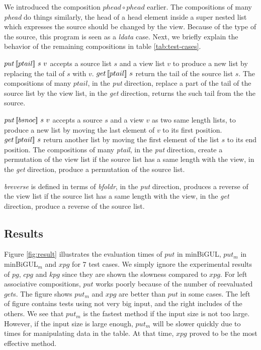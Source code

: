 We introduced the composition $phead \circ phead$ earlier. The compositions of many \textit{phead} do things similarly, the head of a head element inside a super nested list which expresses the source should be changed by the view. Because of the type of the source, this program is seen as a \textit{ldata} case. Next, we briefly explain the behavior of the remaining compositions in table \ref{tab:test-cases}.

$put \, [\![ptail]\!] \ s \ v$ accepts a source list $s$ and a view list $v$ to produce a new list by replacing the tail of $s$ with $v$. $get \, [\![ptail]\!] \ s$ return the tail of the source list $s$. The compositions of many $ptail$, in the \textit{put} direction, replace a part of the tail of the source list by the view list, in the \textit{get} direction, returns the such tail from the the source.

$put \, [\![bsnoc]\!] \ s \ v$ accepts a source $s$ and a view $v$ as two same length lists, to produce a new list by moving the last element of $v$ to its first position. $get \, [\![ptail]\!] \ s$ return another list by moving the first element of the list $s$ to its end position. The compositions of many \textit{ptail}, in the \textit{put} direction, create a permutation of the view list if the source list has a same length with the view, in the \textit{get} direction, produce a permutation of the source list.

\textit{breverse} is defined in terms of \textit{bfoldr}, in the \textit{put} direction, produces a reverse of the view list if the source list has a same length with the view, in the \textit{get} direction, produce a reverse of the source list.

\subsection{Results}



Figure \ref{fig:result} illustrates the evaluation times of $put$ in minBiGUL, $put_m$ in minBiGUL$_m$ and $xpg$ for 7 test cases. We simply ignore the experimental results of $pg$, $cpg$ and $kpg$ since they are shown the slowness compared to $xpg$. For left associative compositions, $put$ works poorly because of the number of reevaluated $get$s. The figure shows $put_m$ and $xpg$ are better than $put$ in some cases. The left of figure contains tests using not very big input, and the right includes of the others. We see that $put_m$ is the fastest method if the input size is not too large. However, if the input size is large enough, $put_m$ will be slower quickly due to times for manipulating data in the table. At that time, $xpg$ proved to be the most effective method.
